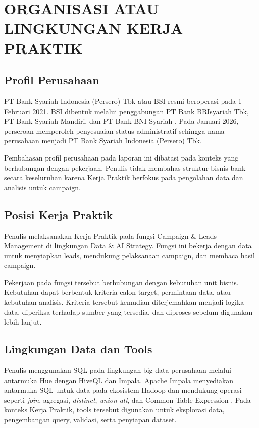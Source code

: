 \cleardoublepage
\chapter{ORGANISASI ATAU LINGKUNGAN KERJA PRAKTIK}
\label{chap:organisasi_lingkungan}

\section{Profil Perusahaan}
PT Bank Syariah Indonesia (Persero) Tbk atau BSI resmi beroperasi pada 1 Februari 2021. BSI dibentuk melalui penggabungan PT Bank BRIsyariah Tbk, PT Bank Syariah Mandiri, dan PT Bank BNI Syariah \autocite{bsi2026}. Pada Januari 2026, perseroan memperoleh penyesuaian status administratif sehingga nama perusahaan menjadi PT Bank Syariah Indonesia (Persero) Tbk.

Pembahasan profil perusahaan pada laporan ini dibatasi pada konteks yang berhubungan dengan pekerjaan. Penulis tidak membahas struktur bisnis bank secara keseluruhan karena Kerja Praktik berfokus pada pengolahan data dan analisis untuk campaign.

\section{Posisi Kerja Praktik}
Penulis melaksanakan Kerja Praktik pada fungsi Campaign \& Leads Management di lingkungan Data \& AI Strategy. Fungsi ini bekerja dengan data untuk menyiapkan leads, mendukung pelaksanaan campaign, dan membaca hasil campaign.

Pekerjaan pada fungsi tersebut berhubungan dengan kebutuhan unit bisnis. Kebutuhan dapat berbentuk kriteria calon target, permintaan data, atau kebutuhan analisis. Kriteria tersebut kemudian diterjemahkan menjadi logika data, diperiksa terhadap sumber yang tersedia, dan diproses sebelum digunakan lebih lanjut.

\section{Lingkungan Data dan Tools}
Penulis menggunakan SQL pada lingkungan big data perusahaan melalui antarmuka Hue dengan HiveQL dan Impala. Apache Impala menyediakan antarmuka SQL untuk data pada ekosistem Hadoop dan mendukung operasi seperti \textit{join}, agregasi, \textit{distinct}, \textit{union all}, dan Common Table Expression \autocite{impala2026}. Pada konteks Kerja Praktik, tools tersebut digunakan untuk eksplorasi data, pengembangan query, validasi, serta penyiapan dataset.

